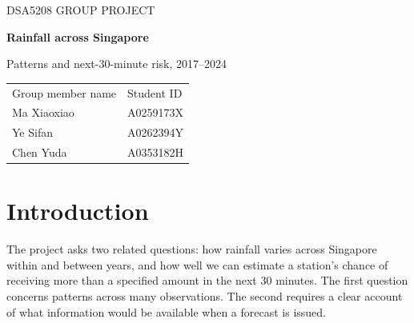 \documentclass[11pt,a4paper]{article}
\begin{document}
\thispagestyle{empty}
{\small\sffamily\color{teal}DSA5208 GROUP PROJECT}\par
\vspace{3mm}
{\LARGE\sffamily\bfseries\color{ink}Rainfall across Singapore}\par
\vspace{1mm}
{\large\sffamily Patterns and next-30-minute risk, 2017--2024}\par
\vspace{4mm}
\begin{tabularx}{\linewidth}{@{}>{\raggedright\arraybackslash}X>{\raggedright\arraybackslash}X@{}}
\small Group member name & \small Student ID\\[5pt]
Ma Xiaoxiao & A0259173X\\[5pt]
Ye Sifan & A0262394Y\\[5pt]
Chen Yuda & A0353182H\\
\end{tabularx}
\vspace{2mm}
\begin{abstract}
Singapore's five-minute rainfall records offer a detailed view of local weather, while uneven coverage affects comparisons over time. We analyse the 2017--2024 annual datasets with Apache Spark, retaining 48.54 million observations from 91 station IDs after cleaning. Among sufficiently complete station-months, November has the highest mean monthly rainfall and wet intervals are most frequent in the afternoon. For prediction, we compare random forests, gradient-boosted trees, logistic regression and historical frequencies under two information settings: recent station rainfall and station/calendar information alone. On 5.73 million shared 2024 test cases, the recent-rainfall forest achieves mean Brier 0.01613, compared with 0.02283 for the calendar forest. RF has the lowest observed mean Brier among the tested classifier pipelines; historical frequency performs best for calendar-only risk. A paired day-block analysis supports a small RF advantage over GBT with recent rainfall, while RF fitting fractions from 15\% to 100\% show no clear mean improvement. Gains are concentrated at low rainfall thresholds, and heavy-rain probability skill remains limited. Later experiments reuse 2024, so model selection remains exploratory. These results support the recent-rainfall RF as a reference model and motivate stronger validation and tail calibration.
\end{abstract}

\section{Introduction}
The project asks two related questions: how rainfall varies across Singapore within and between years, and how well we can estimate a station's chance of receiving more than a specified amount in the next 30 minutes. The first question concerns patterns across many observations. The second requires a clear account of what information would be available when a forecast is issued.
\end{document}
